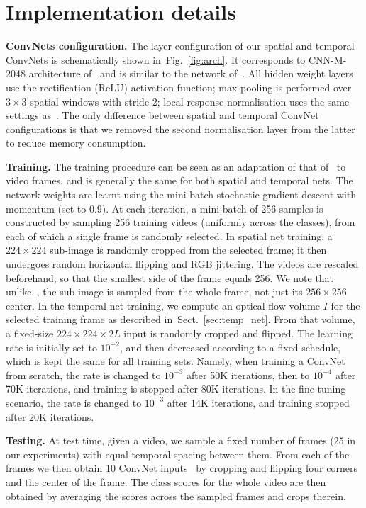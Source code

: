 \documentclass{article} \usepackage{nips14submit_e,times}
\newcommand{\figref}[1]{Fig.~\ref{#1}}
\newcommand{\sref}[1]{Sect.~\ref{#1}}
\begin{document}
\section{Implementation details}
\label{sec:impl}
\label{sec:impl:spatial}
\label{sec:impl:temporal}

\noindent\textbf{ConvNets configuration.}
The layer configuration of our spatial and temporal ConvNets is schematically shown in~\figref{fig:arch}.
It corresponds to CNN-M-2048 architecture of~\cite{Chatfield14} and is similar to the network of~\cite{Zeiler13}.
All hidden weight layers use the rectification (ReLU) activation function; max-pooling is performed over $3\times 3$ spatial windows with stride 2; local response
normalisation uses the same settings as~\cite{Krizhevsky12}.
The only difference between spatial and temporal ConvNet configurations is that we removed the second normalisation layer from the latter to reduce memory consumption. 

\noindent\textbf{Training.} The training procedure can be seen as an adaptation of that of~\cite{Krizhevsky12} to video frames, and is generally the same for both spatial and temporal nets.
The network weights are learnt using the mini-batch stochastic gradient descent with momentum (set to 0.9).
At each iteration, a mini-batch of 256 samples is constructed by sampling 256 training videos (uniformly across the classes), from each of which a single frame is randomly selected.
In spatial net training,  a $224 \times 224$ sub-image is randomly cropped from the selected frame; it then undergoes random horizontal flipping and RGB jittering.
The videos are rescaled beforehand, so that the smallest side of the frame equals 256. 
We note that unlike~\cite{Krizhevsky12}, the sub-image is sampled from the whole frame, not just its $256 \times 256$ center.
In the temporal net training, we compute an optical flow volume $I$ for the selected training frame as described in~\sref{sec:temp_net}.
From that volume, a fixed-size $224\times224\times2L$ input is randomly cropped and flipped.
The learning rate is initially set to $10^{-2}$, and then decreased according to a fixed schedule, which is kept the same for all training sets. 
Namely, when training a ConvNet from scratch, the rate is changed to $10^{-3}$ after 50K iterations, then to $10^{-4}$ after 70K iterations, and training is stopped after 80K iterations.
In the fine-tuning scenario, the rate is changed to $10^{-3}$ after 14K iterations, and training stopped after 20K iterations.

\noindent\textbf{Testing.} At test time, given a video, we sample a fixed number of frames ($25$ in our experiments) with equal temporal spacing between them. 
From each of the frames we then obtain 10 ConvNet inputs~\cite{Krizhevsky12} by cropping and flipping four corners and the center of the frame.
The class scores for the whole video are then obtained by averaging the scores across the sampled frames and crops therein.
\end{document}

